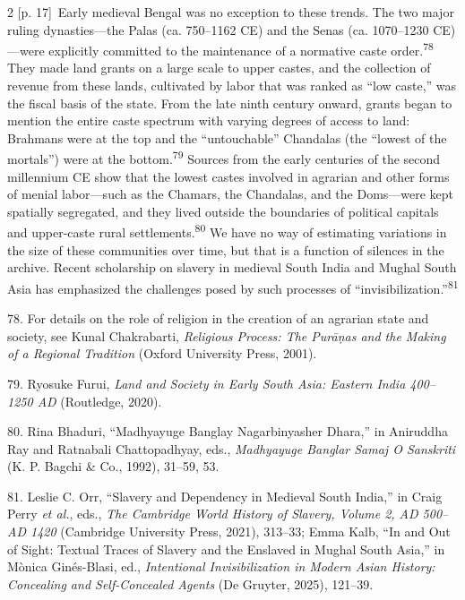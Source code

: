 \documentclass[10pt,a4paper]{article}
\begin{document}
\begin{paracol}{2}
{\scriptsize\color{gray} [p. 17]}\ Early medieval Bengal was no exception to these trends. The two major ruling dynasties—the Palas (ca. 750–1162 CE) and the Senas (ca. 1070–1230 CE)—were explicitly committed to the maintenance of a normative caste order.\nobreak\textsuperscript{78} They made land grants on a large scale to upper castes, and the collection of revenue from these lands, cultivated by labor that was ranked as “low caste,” was the fiscal basis of the state. From the late ninth century onward, grants began to mention the entire caste spectrum with varying degrees of access to land: Brahmans were at the top and the “untouchable” Chandalas (the “lowest of the mortals”) were at the bottom.\nobreak\textsuperscript{79} Sources from the early centuries of the second millennium CE show that the lowest castes involved in agrarian and other forms of menial labor—such as the Chamars, the Chandalas, and the Doms—were kept spatially segregated, and they lived outside the boundaries of political capitals and upper-caste rural settlements.\nobreak\textsuperscript{80} We have no way of estimating variations in the size of these communities over time, but that is a function of silences in the archive. Recent scholarship on slavery in medieval South India and Mughal South Asia has emphasized the challenges posed by such processes of “invisibilization.”\nobreak\textsuperscript{81}\par{\small 78. For details on the role of religion in the creation of an agrarian state and society, see Kunal Chakrabarti, \textit{Religious Process: The Purāṇas and the Making of a Regional Tradition} (Oxford University Press, 2001).\par}{\small 79. Ryosuke Furui, \textit{Land and Society in Early South Asia: Eastern India 400–1250 AD} (Routledge, 2020).\par}{\small 80. Rina Bhaduri, “Madhyayuge Banglay Nagarbinyasher Dhara,” in Aniruddha Ray and Ratnabali Chattopadhyay, eds., \textit{Madhyayuge Banglar Samaj O Sanskriti} (K. P. Bagchi \& Co., 1992), 31–59, 53.\par}{\small 81. Leslie C. Orr, “Slavery and Dependency in Medieval South India,” in Craig Perry \textit{et al.}, eds., \textit{The Cambridge World History of Slavery, Volume 2, AD 500–AD 1420} (Cambridge University Press, 2021), 313–33; Emma Kalb, “In and Out of Sight: Textual Traces of Slavery and the Enslaved in Mughal South Asia,” in Mònica Ginés-Blasi, ed., \textit{Intentional Invisibilization in Modern Asian History: Concealing and Self-Concealed Agents} (De Gruyter, 2025), 121–39.\par}

\end{paracol}
\end{document}
